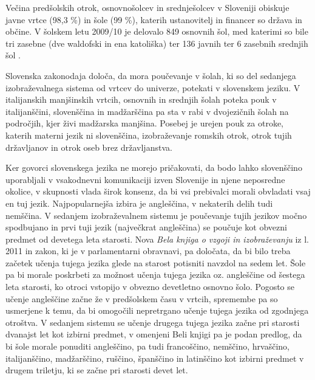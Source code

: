 \begin{multicols}{2}
Večina predšolskih otrok, osnovnošolcev in srednješolcev v Sloveniji obiskuje javne vrtce (98,3 \%) in šole (99 \%), katerih ustanovitelj in financer so država in občine. V šolskem letu 2009/10 je delovalo 849 osnovnih šol, med katerimi so bile tri zasebne (dve waldofski in ena katoliška) ter 136 javnih ter 6 zasebnih srednjih šol \cite{Eurydice1}.

Slovenska zakonodaja določa, da mora poučevanje v šolah, ki so del sedanjega izobraževalnega sistema od vrtcev do univerze, potekati v slovenskem jeziku. V italijanskih manjšinskih vrtcih, osnovnih in srednjih šolah poteka pouk v italijanščini, slovenščina in madžarščina pa sta v rabi v dvojezičnih šolah na področjih, kjer živi madžarska manjšina. Posebej je urejen pouk za otroke, katerih materni jezik ni slovenščina, izobraževanje romskih otrok, otrok tujih državljanov in otrok oseb brez državljanstva.

Ker govorci slovenskega jezika ne morejo pričakovati, da bodo lahko slovenščino uporabljali v vsakodnevni komunikaciji izven Slovenije in njene neposredne okolice, v skupnosti vlada širok konsenz, da bi vsi prebivalci morali obvladati vsaj en tuj jezik. Najpopularnejša izbira je angleščina, v nekaterih delih tudi nemščina. V sedanjem izobraževalnem sistemu je poučevanje tujih jezikov močno spodbujano in prvi tuji jezik (največkrat angleščina) se poučuje kot obvezni predmet od devetega leta starosti. Nova \textit{Bela knjiga o vzgoji in izobraževanju} iz l. 2011 \cite{BK1} in zakon, ki je v parlamentarni obravnavi, pa določata, da bi bilo treba začetek učenja tujega jezika glede na starost potisniti navzdol na sedem let. Šole pa bi morale poskrbeti za možnost učenja tujega jezika oz. angleščine od šestega leta starosti, ko otroci vstopijo v obvezno devetletno osnovno šolo. Pogosto se učenje angleščine začne že v predšolskem času v vrtcih, spremembe pa so usmerjene k temu, da bi omogočili nepretrgano učenje tujega jezika od zgodnjega otroštva. V sedanjem sistemu se učenje drugega tujega jezika začne pri starosti dvanajst let kot izbirni predmet, v omenjeni Beli knjigi pa je podan predlog, da bi šole morale ponuditi angleščino, pa tudi francoščino, nemščino, hrvaščino, italijanščino, madžarščino, ruščino, španščino in latinščino kot izbirni predmet v drugem triletju, ki se začne pri starosti devet let.



\end{multicols}
